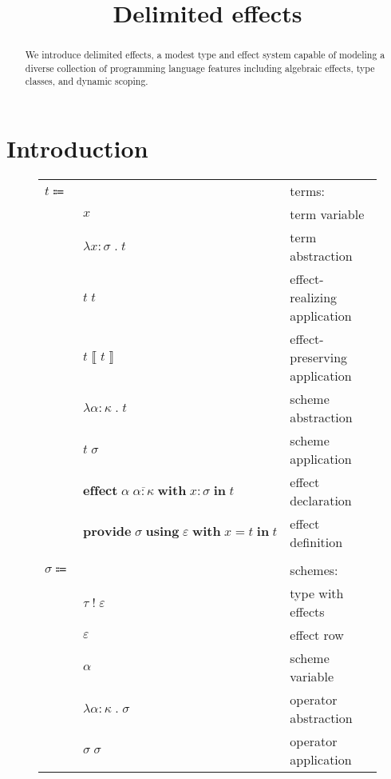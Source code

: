 \documentclass[12pt]{article}
\title{Delimited effects}
\date{}
\newcommand\anno[2]{#1 : #2} %
\newcommand\lstof[1]{\overline{#1}}
\newcommand\eterm{t}
\newcommand\evar{x}
\newcommand\eabs[2]{\lambda #1 \; . \; #2} %
\newcommand\eappxr[2]{#1 \; #2}
\newcommand\eappxp[2]{#1 \left\llbracket #2 \right\rrbracket} %
\newcommand\esabs[2]{\lambda #1 \; . \; #2} %
\newcommand\esapp[2]{#1 \; #2}
\newcommand\eeffect[5]{\textbf{effect} \; #1 \; #2 \; \textbf{with} \; \anno{#3}{#4} \; \textbf{in} \; #5}
\newcommand\eprovide[5]{\textbf{provide} \; #1 \; \textbf{using} \; #2 \; \textbf{with} \; #3 = #4 \; \textbf{in} \; #5}
\newcommand\sscheme{\sigma}
\newcommand\stwithx[2]{#1 \; ! \; #2} %
\newcommand\svar{\alpha}
\newcommand\sabs[2]{\lambda #1 \; . \; #2} %
\newcommand\sapp[2]{#1 \; #2} %
\newcommand\ttype{\tau}
\newcommand\rrow{\varepsilon}
\newcommand\kkind{\kappa}
\begin{document}
  \maketitle

  \begin{abstract}
    We introduce delimited effects, a modest type and effect system capable of modeling a diverse collection of programming language features including algebraic effects, type classes, and dynamic scoping.
  \end{abstract}

  \section{Introduction}

  \begin{figure}
    \begin{mdframed}[backgroundcolor=none]
      \begin{center}
        \begin{tabular}{l l l}
          $\eterm \Coloneqq $ & & terms: \\
          & $\evar$ & term variable \\
          & $\eabs{\anno{\evar}{\sscheme}}{\eterm}$ & term abstraction \\
          & $\eappxr{\eterm}{\eterm}$ & effect-realizing application \\
          & $\eappxp{\eterm}{\eterm}$ & effect-preserving application \\
          & $\esabs{\anno{\svar}{\kkind}}{\eterm}$ & scheme abstraction \\
          & $\esapp{\eterm}{\sscheme}$ & scheme application \\
          & $\eeffect{\svar}{\lstof{\anno{\svar}{\kkind}}}{\evar}{\sscheme}{\eterm}$ & effect declaration \\
          & $\eprovide{\sscheme}{\rrow}{\evar}{\eterm}{\eterm}$ & effect definition \\
          \\
          $\sscheme \Coloneqq$ & & schemes: \\
          & $\stwithx{\ttype}{\rrow}$ & type with effects \\
          & $\rrow$ & effect row \\
          & $\svar$ & scheme variable \\
          & $\sabs{\anno{\svar}{\kkind}}{\sscheme}$ & operator abstraction \\
          & $\sapp{\sscheme}{\sscheme}$ & operator application \\

\end{tabular}
\end{center}
\end{mdframed}
\end{figure}
\end{document}

